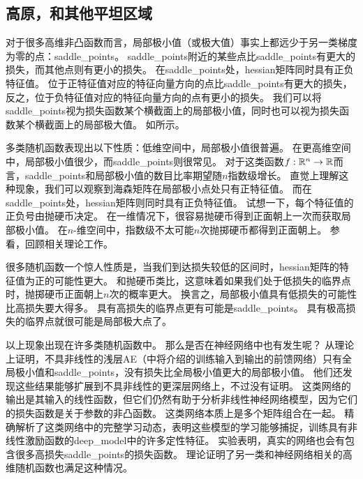 \subsection{高原，和其他平坦区域}
\label{sec:plateaus_saddle_points_and_other_flat_regions}
对于很多高维非凸函数而言，局部极小值（或极大值）事实上都远少于另一类梯度为零的点：\gls{saddle_points}。
\gls{saddle_points}附近的某些点比\gls{saddle_points}有更大的损失，而其他点则有更小的损失。
在\gls{saddle_points}处，\gls{hessian}矩阵同时具有正负特征值。
位于正特征值对应的特征向量方向的点比\gls{saddle_points}有更大的损失，反之，位于负特征值对应的特征向量方向的点有更小的损失。
我们可以将\gls{saddle_points}视为损失函数某个横截面上的局部极小值，同时也可以视为损失函数某个横截面上的局部极大值。
如所示。

多类随机函数表现出以下性质：低维空间中，局部极小值很普遍。
在更高维空间中，局部极小值很少，而\gls{saddle_points}则很常见。
对于这类函数$f:\mathbb{R}^n \to \mathbb{R}$而言，\gls{saddle_points}和局部极小值的数目比率期望随$n$指数级增长。
直觉上理解这种现象，我们可以观察到海森矩阵在局部极小点处只有正特征值。
而在\gls{saddle_points}处，\gls{hessian}矩阵则同时具有正负特征值。
试想一下，每个特征值的正负号由抛硬币决定。
在一维情况下，很容易抛硬币得到正面朝上一次而获取局部极小值。
在$n$-维空间中，指数级不太可能$n$次抛掷硬币都得到正面朝上。
参看\cite{Dauphin-et-al-NIPS2014-small}，回顾相关理论工作。


很多随机函数一个惊人性质是，当我们到达损失较低的区间时，\gls{hessian}矩阵的特征值为正的可能性更大。
和抛硬币类比，这意味着如果我们处于低损失的临界点时，抛掷硬币正面朝上$n$次的概率更大。
换言之，局部极小值具有低损失的可能性比高损失要大得多。
具有高损失的临界点更有可能是\gls{saddle_points}。
具有极高损失的临界点就很可能是局部极大点了。

以上现象出现在许多类随机函数中。
那么是否在神经网络中也有发生呢？
\cite{Baldi89}从理论上证明，不具非线性的浅层\gls{AE}（中将介绍的训练输入到输出的前馈网络）只有全局极小值和\gls{saddle_points}，没有损失比全局极小值更大的局部极小值。
他们还发现这些结果能够扩展到不具非线性的更深层网络上，不过没有证明。
这类网络的输出是其输入的线性函数，但它们仍然有助于分析非线性神经网络模型，因为它们的损失函数是关于参数的非凸函数。
这类网络本质上是多个矩阵组合在一起。
\cite{Saxe-et-al-ICLR13}精确解析了这类网络中的完整学习动态，表明这些模型的学习能够捕捉，训练具有非线性激励函数的\gls{deep_model}中的许多定性特征。
\cite{Dauphin-et-al-NIPS2014-small}实验表明，真实的网络也会有包含很多高损失\gls{saddle_points}的损失函数。
\cite{Choromanska-et-al-AISTATS2015}理论证明了另一类和神经网络相关的高维随机函数也满足这种情况。

